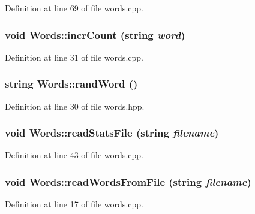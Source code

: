 Definition at line 69 of file words.cpp.

\hypertarget{class_words_a0fbf822903274918a58037d28ed67705}{
\subsubsection[{incrCount}]{\setlength{\rightskip}{0pt plus 5cm}void Words::incrCount (string {\em word})}}
\label{class_words_a0fbf822903274918a58037d28ed67705}


Definition at line 31 of file words.cpp.

\hypertarget{class_words_aff5f07ad739bf8b4b9de0e05caf42a76}{
\subsubsection[{randWord}]{\setlength{\rightskip}{0pt plus 5cm}string Words::randWord ()}}
\label{class_words_aff5f07ad739bf8b4b9de0e05caf42a76}


Definition at line 30 of file words.hpp.

\hypertarget{class_words_afc57ba78c1c58691216fc92dedb427c7}{
\subsubsection[{readStatsFile}]{\setlength{\rightskip}{0pt plus 5cm}void Words::readStatsFile (string {\em filename})}}
\label{class_words_afc57ba78c1c58691216fc92dedb427c7}


Definition at line 43 of file words.cpp.

\hypertarget{class_words_aa5d7388fc0d464db38f60dbfcb4bd875}{
\subsubsection[{readWordsFromFile}]{\setlength{\rightskip}{0pt plus 5cm}void Words::readWordsFromFile (string {\em filename})}}
\label{class_words_aa5d7388fc0d464db38f60dbfcb4bd875}


Definition at line 17 of file words.cpp.

